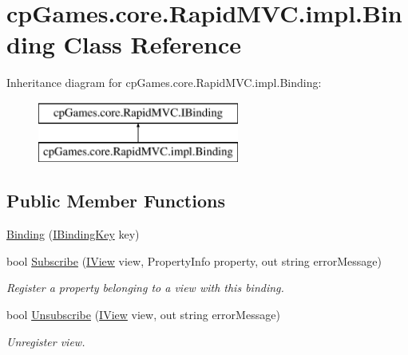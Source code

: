 \hypertarget{classcp_games_1_1core_1_1_rapid_m_v_c_1_1impl_1_1_binding}{}\section{cp\+Games.\+core.\+Rapid\+M\+V\+C.\+impl.\+Binding Class Reference}
\label{classcp_games_1_1core_1_1_rapid_m_v_c_1_1impl_1_1_binding}
Inheritance diagram for cp\+Games.\+core.\+Rapid\+M\+V\+C.\+impl.\+Binding\+:\begin{figure}[H]
\begin{center}
\leavevmode
\includegraphics[height=2.000000cm]{classcp_games_1_1core_1_1_rapid_m_v_c_1_1impl_1_1_binding}
\end{center}
\end{figure}
\subsection*{Public Member Functions}
\begin{DoxyCompactItemize}
\item 
\mbox{\hyperlink{classcp_games_1_1core_1_1_rapid_m_v_c_1_1impl_1_1_binding_aa53ebf2d17f246c0af5c6e4e4383ba54}{Binding}} (\mbox{\hyperlink{interfacecp_games_1_1core_1_1_rapid_m_v_c_1_1_i_binding_key}{I\+Binding\+Key}} key)
\item 
bool \mbox{\hyperlink{classcp_games_1_1core_1_1_rapid_m_v_c_1_1impl_1_1_binding_a151e86bcc928830e09f9f55197b88487}{Subscribe}} (\mbox{\hyperlink{interfacecp_games_1_1core_1_1_rapid_m_v_c_1_1_i_view}{I\+View}} view, Property\+Info property, out string error\+Message)
\begin{DoxyCompactList}\small\item\em Register a property belonging to a view with this binding. \end{DoxyCompactList}\item 
bool \mbox{\hyperlink{classcp_games_1_1core_1_1_rapid_m_v_c_1_1impl_1_1_binding_a3e96a5bc762f4b4c5ffbc9298da1dfb9}{Unsubscribe}} (\mbox{\hyperlink{interfacecp_games_1_1core_1_1_rapid_m_v_c_1_1_i_view}{I\+View}} view, out string error\+Message)
\begin{DoxyCompactList}\small\item\em Unregister view. \end{DoxyCompactList}\end{DoxyCompactItemize}
